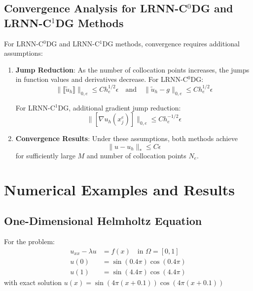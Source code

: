 \documentclass[11pt,a4paper]{article}
\begin{document}
\subsection{Convergence Analysis for LRNN-C$^0$DG and LRNN-C$^1$DG Methods}

For LRNN-C$^0$DG and LRNN-C$^1$DG methods, convergence requires additional assumptions:

\begin{enumerate}
    \item \textbf{Jump Reduction}: As the number of collocation points increases, the jumps in function values and derivatives decrease. For LRNN-C$^0$DG:
    \begin{equation}
    \|\llbracket \tilde{u}_h \rrbracket\|_{0,e} \leq Ch_e^{1/2}\epsilon \quad \text{and} \quad \|\tilde{u}_h - g\|_{0,e} \leq Ch_e^{1/2}\epsilon
    \end{equation}
    
    For LRNN-C$^1$DG, additional gradient jump reduction:
    \begin{equation}
    \|[\nabla u_h(x_j^e)]\|_{0,e} \leq Ch_e^{-1/2}\epsilon
    \end{equation}
    
    \item \textbf{Convergence Results}: Under these assumptions, both methods achieve
    \begin{equation}
    \|u - u_h\|_* \leq C\epsilon
    \end{equation}
    for sufficiently large $M$ and number of collocation points $N_e$.
\end{enumerate}

\section{Numerical Examples and Results}

\subsection{One-Dimensional Helmholtz Equation}

For the problem:
\begin{align}
u_{xx} - \lambda u &= f(x) \quad \text{in } \Omega = [0,1]\\
u(0) &= \sin(0.4\pi) \cos(0.4\pi)\\
u(1) &= \sin(4.4\pi) \cos(4.4\pi)
\end{align}
with exact solution $u(x) = \sin(4\pi(x+0.1)) \cos(4\pi(x+0.1))$
\end{document}
